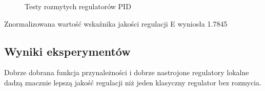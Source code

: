 \begin{figure}[H] 
    \centering
    
    \caption{Testy rozmytych regulatorów PID}
    \label{lab:zad4:eksperymenty:figure}
 \end{figure}

 Znormalizowana wartość wskaźnika jakości regulacji E wyniosła \num{1.7845}


\subsection{Wyniki eksperymentów}

Dobrze dobrana funkcja przynależności i dobrze nastrojone regulatory lokalne dadzą
znacznie lepszą jakość regulacji niż jeden klasyczny regulator bez rozmycia.

\newpage